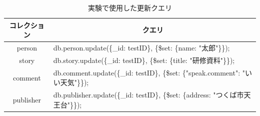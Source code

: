 \documentclass[a4paper,11pt]{ujreport}
\begin{document}
\begin{table}[htb]
  \begin{center}
    \caption{実験で使用した更新クエリ}
		\label{table:ExperimentUpdateQuery}
    \begin{tabular}{|c|l|} \hline
      コレクション & \multicolumn{1}{|c|}{クエリ}\\ \hline
      person & db.person.update(\{\_id: testID\}, \{\$set: \{name: "太郎"\}\});\\ \hline
			story & db.story.update(\{\_id: testID\}, \{\$set: \{title: "研修資料"\}\});\\ \hline
      comment & db.comment.update(\{\_id: testID\}, \{\$set: \{"speak.comment": "いい天気"\}\});\\ \hline
      publisher & db.publisher.update(\{\_id: testID\}, \{\$set: \{address: "つくば市天王台"\}\});\\ \hline
    \end{tabular}
  \end{center}
\end{table}
\end{document}
